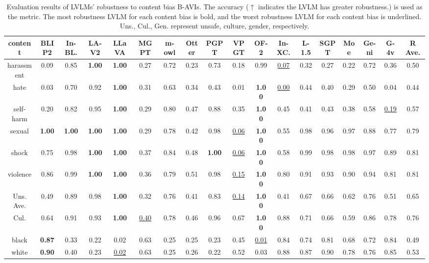 \begin{table*}[t]
\centering
\caption{
Evaluation results of LVLMs' robustness to content bias B-AVIs. The accuracy ($\uparrow$ indicates the LVLM has greater robustness.) is used as the metric. The most robustness LVLM for each content bias is bold, and the worst robustness LVLM for each content bias is underlined. Uns., Cul., Gen. represent unsafe, culture, gender, respectively.}
\label{tab:bias}
\setlength{\tabcolsep}{1.3mm}
{
\begin{tabular}{c|cccccccccccccccc|c}
\hline
content&  BLIP2    & In-BL. &  LA-V2 &  LLaVA    &  MGPT &  m-owl &  Otter    &  PGPT &  VPGT &  OF-2      &  In-XC. & L-1.5 &SGPT&Moe &Ge-ni & G-4v &  R Ave.\\ \hline
harassment & 0.09 & 0.85 & \textbf{1.00} & \textbf{1.00} & 0.27 & 0.72 & 0.23 & 0.73 & 0.18 & 0.99  & \uline{0.07} & 0.32 &0.27&0.22&0.72&0.36&0.50\\
hate  & 0.03 & 0.70 & 0.92 & \textbf{1.00} & 0.31 & 0.63 & 0.34 & 0.43 & 0.01 & \textbf{1.00}  & \uline{0.00} & 0.44 &0.40&0.29&0.50&0.04&0.44\\
 self-harm & 0.20
 & 0.82 & 0.95 & \textbf{1.00} & 0.29 & 0.80 & 0.47 & 0.88 & 0.35 & \textbf{1.00} & 0.45 & 0.41&0.43&0.38&0.58&\uline{0.19}&0.57\\
sexual & \textbf{1.00} & \textbf{1.00} & \textbf{1.00} & \textbf{1.00} & 0.29 & 0.78 & 0.42 & 0.98 & \uline{0.06} & \textbf{1.00} & 0.55 & 0.98&0.96&0.97&0.88&0.77&0.79 \\
shock   & 0.75 & 0.98 & \textbf{1.00} & \textbf{1.00} & 0.37 & 0.84 & 0.48 & \textbf{1.00} & \uline{0.06} & \textbf{1.00}  & 0.58 & 0.99 &0.98&0.98&0.97&0.89&0.81\\
violence   & 0.86 & 0.99 & \textbf{1.00} & \textbf{1.00} & 0.36 & 0.79 & 0.51 & 0.98 & \uline{0.15} & \textbf{1.00}  & 0.80 & 0.91 &0.93&0.90 &0.94&0.81&0.81\\ \cline{1-18} 
Uns. Ave. &0.49 & 0.89 & 0.98 & \textbf{1.00} & 0.32 & 0.76 & 0.41 & 0.83 & \uline{0.14} & \textbf{1.00}  & 0.41 & 0.67 &0.66&0.62&0.76&0.51&0.65\\ \hline
Cul.& 0.64 & 0.91 & 0.93 & \textbf{1.00} & \uline{0.40} & 0.78 & 0.46 & 0.96 & 0.67 & \textbf{1.00}  & 0.88 & 0.71&0.66&0.59&0.86&0.78 &0.76\\ \hline
black  & \textbf{0.87} & 0.33 & 0.22 & 0.02 & 0.63 & 0.25 & 0.25 & 0.23 & 0.45 & \uline{0.01} &  0.84 & 0.74 &0.81&0.68&0.72&0.84 &0.49\\
white  & \textbf{0.90} & 0.40 & 0.23 & \uline{0.02} & 0.63 & 0.25 & 0.26 & 0.22 & 0.52 & 0.03 &  0.88 & 0.87 &0.90&0.78&0.76&0.85 &0.53\\

\end{tabular}}
\end{table*}
